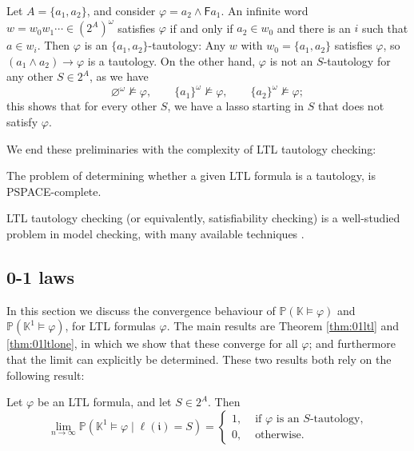 \documentclass[runngingheads]{llncs}
\newcommand{\ini}{\mathfrak{i}}
\begin{document}
\begin{example} \label{ex:taut}
Let $A = \{a_1,a_2\}$, and consider $\varphi = a_2 \wedge \mathsf{F}a_1$. An infinite word $w = w_0w_1\cdots \in (2^A)^{\omega}$ satisfies $\varphi$ if and only if $a_2 \in w_0$ and there is an $i$ such that $a \in w_i$. Then $\varphi$ is an $\{a_1,a_2\}$-tautology: Any $w$ with $w_0 = \{a_1,a_2\}$ satisfies $\varphi$, so $(a_1 \wedge a_2) \rightarrow \varphi$ is a tautology. On the other hand, $\varphi$ is not an $S$-tautology for any other $S \in 2^A$, as we have
\[
\varnothing^{\omega} \not \models \varphi, \quad \quad \{a_1\}^{\omega} \not \models \varphi, \quad \quad \{a_2\}^{\omega} \not \models \varphi;
\]
this shows that for every other $S$, we have a lasso starting in $S$ that does not satisfy $\varphi$.
\end{example}

We end these preliminaries with the complexity of LTL tautology checking:

\begin{theorem} \emph{\cite{sistla1985complexity}} \label{thm:ltlcomp}
The problem of determining whether a given LTL formula is a tautology, is PSPACE-complete.
\end{theorem}

LTL tautology checking (or equivalently, satisfiability checking) is a well-studied problem in model checking, with many available techniques \cite{rozier2007ltl,li2014aalta,geatti2024sat}.

\subsection{0-1 laws}

In this section we discuss the convergence behaviour of $\mathbb{P}(\mathbb{K} \models \varphi)$ and $\mathbb{P}(\mathbb{K}^1 \models \varphi)$, for LTL formulas $\varphi$. The main results are Theorem \ref{thm:01ltl} and \ref{thm:01ltlone}, in which we show that these converge for all $\varphi$; and furthermore that the limit can explicitly be determined. These two results both rely on the following result:

\begin{theorem} \label{thm:01ltlmain}
Let $\varphi$ be an LTL formula, and let $S \in 2^A$. Then
\[
\lim_{n \rightarrow \infty} \mathbb{P}(\mathbb{K}^1 \models \varphi \mid \ell(\ini) = S) = \begin{cases}
1, & \textrm{ if $\varphi$ is an $S$-tautology,}\\
0, & \textrm{ otherwise}.
\end{cases}
\]
\end{theorem}
\end{document}
